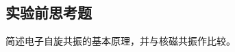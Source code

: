 \documentclass[dvipsnames, svgnames,a4paper,11pt]{article}
\begin{document}
\clearpage
\subsection{实验前思考题}

\begin{question}
	简述电子自旋共振的基本原理，并与核磁共振作比较。
\end{question}




\end{document}
